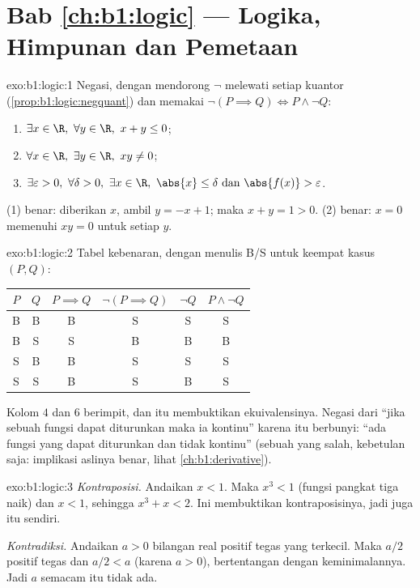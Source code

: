 \section*{Bab \ref{ch:b1:logic} --- Logika, Himpunan dan Pemetaan}

\begin{solution}{exo:b1:logic:1}
Negasi, dengan mendorong $\lnot$ melewati setiap kuantor
(\cref{prop:b1:logic:negquant}) dan memakai $\lnot(P \implies Q) \iff
P \land \lnot Q$:
\begin{enumerate}
  \item $\exists x \in \R,\ \forall y \in \R,\ x + y \leq 0$;
  \item $\forall x \in \R,\ \exists y \in \R,\ xy \neq 0$;
  \item $\exists \varepsilon > 0,\ \forall \delta > 0,\ \exists x \in
        \R,\ \abs{x} \leq \delta \text{ dan } \abs{f(x)} >
        \varepsilon$.
\end{enumerate}
 (1) benar: diberikan $x$, ambil $y = -x + 1$; maka $x + y = 1 >
0$.  (2) benar: $x = 0$ memenuhi $xy = 0$ untuk setiap $y$.
\end{solution}

\begin{solution}{exo:b1:logic:2}
Tabel kebenaran, dengan menulis B/S untuk keempat kasus $(P, Q)$:
\begin{center}
\begin{tabular}{cc|c|c|c|c}
$P$ & $Q$ & $P \implies Q$ & $\lnot(P \implies Q)$ & $\lnot Q$ &
$P \land \lnot Q$ \\
\hline
B & B & B & S & S & S \\
B & S & S & B & B & B \\
S & B & B & S & S & S \\
S & S & B & S & B & S \\
\end{tabular}
\end{center}
Kolom $4$ dan $6$ berimpit, dan itu membuktikan ekuivalensinya. Negasi
dari ``jika sebuah fungsi dapat diturunkan maka ia kontinu'' karena itu
berbunyi: ``ada fungsi yang dapat diturunkan dan tidak kontinu''
(sebuah  yang salah, kebetulan saja: implikasi aslinya benar,
lihat \cref{ch:b1:derivative}).
\end{solution}

\begin{solution}{exo:b1:logic:3}
\emph{Kontraposisi.} Andaikan $x < 1$. Maka $x^3 < 1$ (fungsi pangkat
tiga naik) dan $x < 1$, sehingga $x^3 + x < 2$. Ini membuktikan
kontraposisinya, jadi juga  itu sendiri.

\emph{Kontradiksi.} Andaikan $a > 0$ bilangan real positif tegas yang
terkecil. Maka $a/2$ positif tegas dan $a/2 < a$ (karena $a > 0$),
bertentangan dengan keminimalannya. Jadi $a$ semacam itu tidak ada.
\end{solution}

